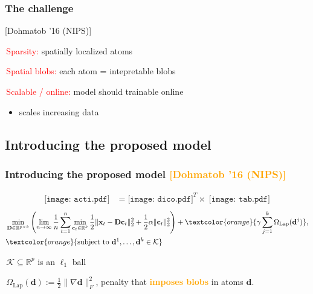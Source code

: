\documentclass{beamer}
\def\mydot{\structure{\rule{1ex}{1ex}}\,}
\def\B#1{\mathbf{#1}}
\def\emph#1{\textbf{\textcolor{orange}{#1}}}
\newcommand{\mycite}[1]{\textcolor{myblue}{[#1]}}
\begin{document}
\begin{frame}
  \frametitle{The challenge}\Large
\mycite{Dohmatob '16 (NIPS)}

  \bigskip
  
  \mydot \textcolor{red}{Sparsity:} spatially localized atoms

  \bigskip

  \mydot \textcolor{red}{Spatial blobs:} each atom = intepretable blobs

  \bigskip
  
  \mydot \textcolor{red}{Scalable / online:} model should trainable online
  \begin{itemize}
  \item scales increasing data
  \end{itemize}
  
\end{frame}


\subsection{Introducing the proposed model}
\begin{frame}
  \frametitle{Introducing the proposed model \textcolor{orange}{[Dohmatob '16 (NIPS)]}}
  \vspace{-2em}
    \begin{equation*}
      \begin{split}
      {\texttt{[image: acti.pdf]}} &= {\texttt{[image: dico.pdf]}^T} \times \;{\texttt{[image: tab.pdf]}}
      \end{split}
    \end{equation*}
\vspace{-1.5em}
\begin{eqnarray*}
  \begin{split}
    &\min_{\B{D} \in \mathbb R^{p \times k}}\left(\lim_{n \rightarrow \infty}\frac{1}{n}\sum_{t=1}^n\min_{\B{c}_t \in \mathbb R^{k}}\frac{1}{2} \|\B{x}_t-\B{D}\B{c}_t\|_2^2 +  \frac{1}{2}\alpha\|\B{c}_t\|_2^2\right) + \textcolor{orange}{\gamma\sum_{j=1}^k\Omega_{\text{Lap}}(\B{d}^j)},\\
    &\textcolor{orange}{\text{subject to } \B{d}^1,\ldots,\B{d}^k \in \mathcal K}
  \end{split}
\end{eqnarray*}


 {
  \mydot $\mathcal K \subseteq \mathbb R^p$ is an $\ell_1$ ball

  \mydot $\Omega_{\text{Lap}}(\B{d}) := \frac{1}{2}\|\nabla \B{d}\|_F^2$, penalty that \emph{imposes blobs} in atoms $\B{d}$.
}

\end{frame}
\end{document}
